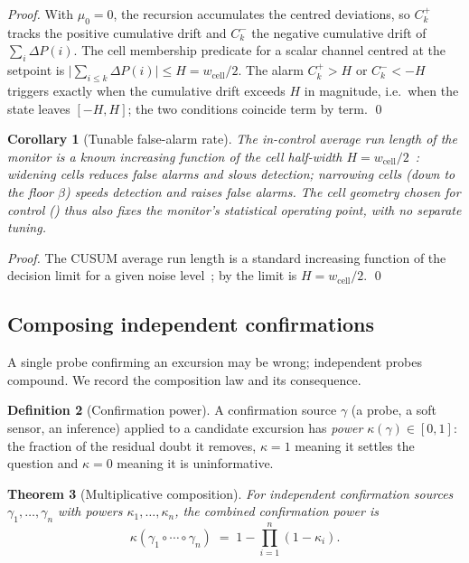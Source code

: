 \documentclass[11pt,a4paper,twocolumn]{article}
\theoremstyle{thmstyle}
\newtheorem{theorem}{Theorem}[section]
\newtheorem{corollary}[theorem]{Corollary}
\theoremstyle{definition}
\newtheorem{definition}[theorem]{Definition}
\theoremstyle{remark}
\newcommand{\DP}{\Delta P}
\newcommand{\wcell}{w_{\mathrm{cell}}}
\newcommand{\floor}{\beta}
\begin{document}
\begin{proof}
With $\mu_0=0$, the recursion accumulates the centred deviations, so
$C_k^{+}$ tracks the positive cumulative drift and $C_k^{-}$ the negative
cumulative drift of $\sum_i\DP(i)$. The cell membership predicate for a
scalar channel centred at the setpoint is
$\bigl|\sum_{i\le k}\DP(i)\bigr|\le H=\wcell/2$. The alarm
$C_k^{+}>H$ or $C_k^{-}<-H$ triggers exactly when the cumulative drift
exceeds $H$ in magnitude, i.e.\ when the state leaves $[-H,H]$; the two
conditions coincide term by term. \qed
\end{proof}

\begin{corollary}[Tunable false-alarm rate]
\label{cor:arl}
The in-control average run length of the monitor is a known increasing
function of the cell half-width $H=\wcell/2$~\citep{lucas1982fast}:
widening cells reduces false alarms and slows detection; narrowing cells
(down to the floor $\floor$) speeds detection and raises false alarms.
The cell geometry chosen for control () thus \emph{also}
fixes the monitor's statistical operating point, with no separate tuning.
\end{corollary}

\begin{proof}
The CUSUM average run length is a standard increasing function of the
decision limit for a given noise level~\citep{lucas1982fast,montgomery2020spc};
by  the limit is $H=\wcell/2$. \qed
\end{proof}

\subsection{Composing independent confirmations}

A single probe confirming an excursion may be wrong; independent probes
compound. We record the composition law and its consequence.

\begin{definition}[Confirmation power]
\label{def:power}
A confirmation source $\gamma$ (a probe, a soft sensor, an inference)
applied to a candidate excursion has \emph{power}
$\kappa(\gamma)\in[0,1]$: the fraction of the residual doubt it removes,
$\kappa=1$ meaning it settles the question and $\kappa=0$ meaning it is
uninformative.
\end{definition}

\begin{theorem}[Multiplicative composition]
\label{thm:multiplicative}
For independent confirmation sources $\gamma_1,\dots,\gamma_n$ with powers
$\kappa_1,\dots,\kappa_n$, the combined confirmation power is
\begin{equation}
\label{eq:mult}
\kappa(\gamma_1\circ\cdots\circ\gamma_n)\;=\;1-\prod_{i=1}^{n}(1-\kappa_i).
\end{equation}
\end{theorem}
\end{document}
